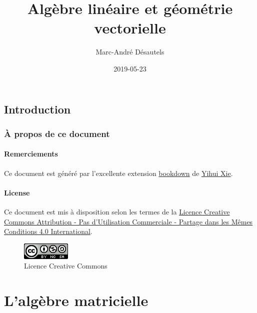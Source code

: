 \documentclass[]{book}
\title{Algèbre linéaire et géométrie vectorielle}
\author{Marc-André Désautels}
\date{2019-05-23}
\theoremstyle{definition}
\theoremstyle{definition}
\theoremstyle{definition}
\theoremstyle{remark}
\begin{document}
\maketitle

{
\setcounter{tocdepth}{2}
\tableofcontents
}
\hypertarget{introduction}{%
\chapter*{Introduction}\label{introduction}}

\hypertarget{a-propos-de-ce-document}{%
\section*{À propos de ce document}\label{a-propos-de-ce-document}}

\hypertarget{remerciements}{%
\subsection*{Remerciements}\label{remerciements}}

Ce document est généré par l'excellente extension \href{https://bookdown.org/}{bookdown} de \href{https://yihui.name/}{Yihui Xie}.

\hypertarget{license}{%
\subsection*{License}\label{license}}

Ce document est mis à disposition selon les termes de la \href{http://creativecommons.org/licenses/by-nc-sa/4.0/}{Licence Creative Commons Attribution - Pas d'Utilisation Commerciale - Partage dans les Mêmes Conditions 4.0 International}.

\begin{figure}
\centering
\includegraphics{resources/icons/license_cc.png}
\caption{Licence Creative Commons}
\end{figure}

\hypertarget{part-lalgebre-matricielle}{%
\part{L'algèbre matricielle}\label{part-lalgebre-matricielle}}
\end{document}
